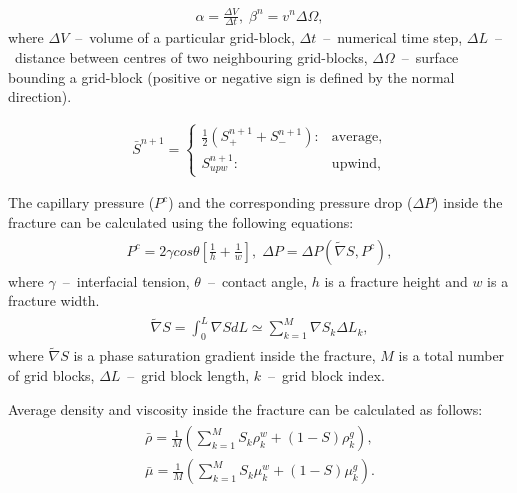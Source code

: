 \documentclass[a4paper,12pt]{extreport}
\begin{document}
  \begin{eqnarray}
  \label{eq:twophase_alpha_beta}
  \alpha = \frac{\Delta V}{\Delta t}, \;
  \beta^n = v^n\Delta \Omega,
  \end{eqnarray}
  where $\Delta V$~--~volume of a particular grid-block, $\Delta t$~--~numerical time step, $\Delta L$~--~distance between centres of two neighbouring grid-blocks, $\Delta \Omega$~--~surface bounding a grid-block (positive or negative sign is defined by the normal direction).

\begin{eqnarray}
\label{eq:twophase_delta_num}
\bar{S}^{n+\mathit 1} = \begin{cases}
\frac{1}{2}\left(S_{+}^{n+\mathit{1}} + S_{-}^{n+\mathit{1}}\right) : &\text{average},\\
S_{upw}^{n+\mathit{1}} : &\text{upwind},
\end{cases}
\end{eqnarray}
 
 The capillary pressure ($P^c$)  and the corresponding pressure drop ($\Delta P$) inside the fracture can be calculated using the following equations:
  \begin{eqnarray}
  \begin{gathered}
  \label{eq:twophase_capillary_pressure_fractures}
  P^{c} = 2 \gamma cos \theta \left[\frac{1}{h} + \frac{1}{w}\right], \; \Delta P = \Delta P \left(\tilde{\nabla} S, P^c\right),
  \end{gathered}
  \end{eqnarray}
  where $\gamma$~--~interfacial tension, $\theta$~--~contact angle, $h$ is a fracture height and $w$ is a fracture width.
  \begin{eqnarray}
  \label{eq:twophase_av_saturation_grad}
  \begin{gathered}
  \tilde{\nabla} S = \int_{0}^{L} \nabla S dL \simeq\sum_{k=1}^{M} \nabla S_{k} \Delta L_{k},
  \end{gathered}
  \end{eqnarray}
 where $\tilde{\nabla} S$ is a phase saturation gradient inside the fracture, $M$ is a total number of grid blocks, $\Delta L$~--~grid block length, $k$~--~grid block index.
 
 
Average density and viscosity inside the fracture can be calculated as follows:
  \begin{eqnarray}
  \label{eq:twophase_dens_visc}
  \begin{gathered}
  \bar{\rho} = \frac{1}{M}\left(\sum_{k=1}^M S_{k} \rho_k^w+ \left(1-S\right) \rho_k^g\right), \\
  \bar{\mu} = \frac{1}{M}\left(\sum_{k=1}^M S_{k} \mu_k^w+ \left(1-S\right) \mu_k^g\right).
  \end{gathered}
  \end{eqnarray}
\end{document}
